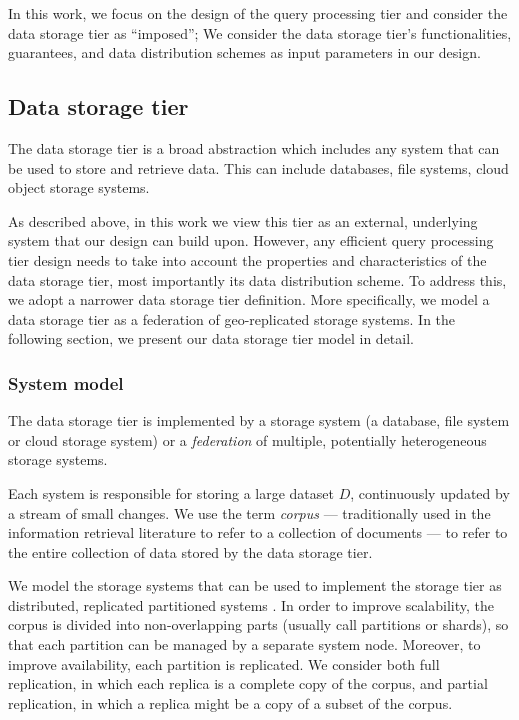 In this work, we focus on the design of the query processing tier and consider the data storage tier as ``imposed'';
We consider the data storage tier's functionalities, guarantees, and data distribution schemes as input parameters in
our design.


\subsection{Data storage tier}

The data storage tier is a broad abstraction which includes any system that can be used to store and retrieve data.
This can include databases, file systems, cloud object storage systems.

As described above, in this work we view this tier as an external, underlying system that our design can build upon.
However, any efficient query processing tier design needs to take into account the properties and characteristics of the
data storage tier, most importantly its data distribution scheme.
To address this, we adopt a narrower data storage tier definition.
More specifically, we model a data storage tier as a federation of geo-replicated storage systems.
In the following section, we present our data storage tier model in detail.


\subsubsection{System model}
The data storage tier is implemented by a storage system (a database, file system or cloud storage system) or a
\textit{federation} of multiple, potentially heterogeneous storage systems.

Each system is responsible for storing a large dataset $D$, continuously updated by a stream of small changes.
We use the term \textit{corpus}  --- traditionally used in the information retrieval literature to refer to a collection of documents ---
to refer to the entire collection of data stored by the data storage tier.

We model the storage systems that can be used to implement the storage tier as distributed, replicated partitioned systems \cite{agrawal:taxonomy}.
In order to improve scalability, the corpus is divided into non-overlapping parts (usually call partitions or shards),
so that each partition can be managed by a separate system node.
Moreover, to improve availability, each partition is replicated.
We consider both full replication, in which each replica is a complete copy of the corpus,
and partial replication, in which a replica might be a copy of a subset of the corpus.

